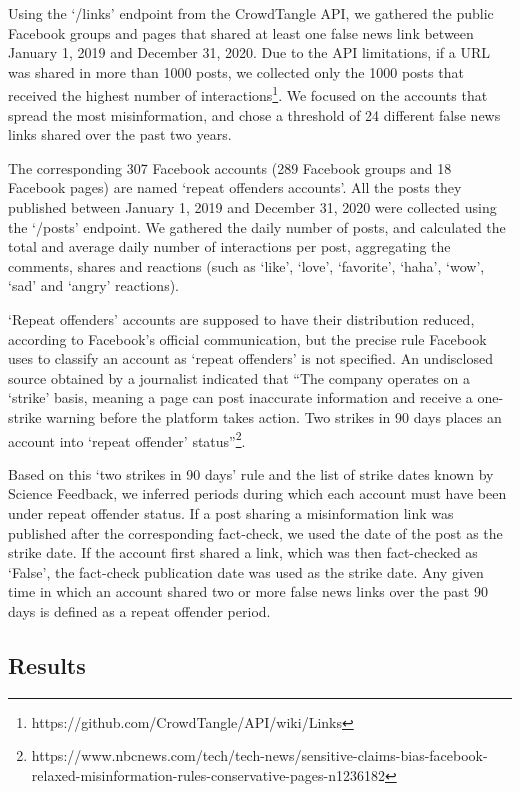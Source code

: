\documentclass[11pt,a4paper]{article}
\begin{document}
Using the `/links' endpoint from the CrowdTangle API, we gathered the public Facebook groups and pages that shared at least one false news link between January 1, 2019 and December 31, 2020. Due to the API limitations, if a URL was shared in more than 1000 posts, we collected only the 1000 posts that received the highest number of interactions\footnote{https://github.com/CrowdTangle/API/wiki/Links}. We focused on the accounts that spread the most misinformation, and chose a threshold of 24 different false news links shared over the past two years. 

The corresponding 307 Facebook accounts (289 Facebook groups and 18 Facebook pages) are named `repeat offenders accounts'. All the posts they published between January 1, 2019 and December 31, 2020 were collected using the `/posts' endpoint. We gathered the daily number of posts, and calculated the total and average daily number of interactions per post, aggregating the comments, shares and reactions (such as ‘like’, ‘love’, ‘favorite’, ‘haha’, ‘wow’, ‘sad’ and ‘angry’ reactions).

`Repeat offenders' accounts are supposed to have their distribution reduced, according to Facebook's official communication, but the precise rule Facebook uses to classify an account as `repeat offenders' is not specified. An undisclosed source obtained by a journalist indicated that ``The company operates on a `strike' basis, meaning a page can post inaccurate information and receive a one-strike warning before the platform takes action. Two strikes in 90 days places an account into `repeat offender' status''\footnote{https://www.nbcnews.com/tech/tech-news/sensitive-claims-bias-facebook-relaxed-misinformation-rules-conservative-pages-n1236182}.

Based on this `two strikes in 90 days' rule and the list of strike dates known by Science Feedback, we inferred periods during which each account must have been under repeat offender status. If a post sharing a misinformation link was published after the corresponding fact-check, we used the date of the post as the strike date. If the account first shared a link, which was then fact-checked as `False', the fact-check publication date was used as the strike date. Any given time in which an account shared two or more false news links over the past 90 days is defined as a repeat offender period.

\subsection{Results}
\end{document}
